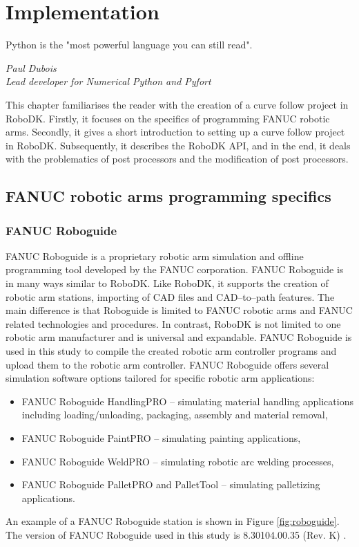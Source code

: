 \chapter{Implementation \label{chap:implementation}}



\epigraph{Python is the "most powerful language you can still read".}{\textit{Paul Dubois \\ Lead developer for Numerical Python and Pyfort }}

This chapter familiarises the reader with the creation of a curve follow project in RoboDK. Firstly, it focuses on the specifics of programming FANUC robotic arms. Secondly, it gives a short introduction to setting up a curve follow project in RoboDK. Subsequently, it describes the RoboDK API, and in the end, it deals with the problematics of post processors and the modification of post processors.

\section{FANUC robotic arms programming specifics}

\subsection{FANUC Roboguide}

FANUC Roboguide is a proprietary robotic arm simulation and offline programming tool developed by the FANUC corporation. FANUC Roboguide is in many ways similar to RoboDK.  Like RoboDK, it supports the creation of robotic arm stations, importing of CAD files and CAD--to--path features. The main difference is that Roboguide is limited to FANUC robotic arms and FANUC related technologies and procedures. In contrast, RoboDK is not limited to one robotic arm manufacturer and is universal and expandable. FANUC Roboguide is used in this study to compile the created robotic arm controller programs and upload them to the robotic arm controller. FANUC Roboguide offers several simulation software options tailored for specific robotic arm applications:

\begin{itemize}

\item FANUC Roboguide HandlingPRO -- simulating material handling applications including loading/unloading, packaging, assembly and material removal,
\item FANUC Roboguide PaintPRO -- simulating painting applications,
\item FANUC Roboguide WeldPRO -- simulating robotic arc welding processes,
\item FANUC Roboguide PalletPRO and PalletTool -- simulating palletizing applications.

\end{itemize}
An example of a FANUC Roboguide station is shown in Figure \ref{fig:roboguide}. The version of FANUC Roboguide used in this study is 8.30104.00.35 (Rev. K) \cite{roboguide}. 

